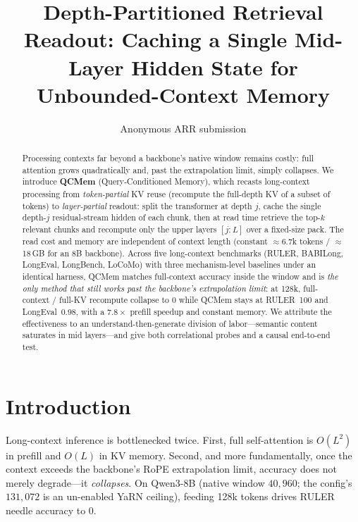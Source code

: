 \documentclass[11pt]{article}
\title{Depth-Partitioned Retrieval Readout: Caching a Single Mid-Layer
Hidden State for Unbounded-Context Memory}
\author{Anonymous ARR submission}
\begin{document}
\maketitle

\begin{abstract}
Processing contexts far beyond a backbone's native window remains costly:
full attention grows quadratically and, past the extrapolation limit,
simply collapses. We introduce \textbf{QCMem} (Query-Conditioned Memory),
which recasts long-context processing from \emph{token-partial} KV reuse
(recompute the full-depth KV of a subset of tokens) to
\emph{layer-partial} readout: split the transformer at depth $j$, cache the
single depth-$j$ residual-stream hidden of each chunk, then at read time
retrieve the top-$k$ relevant chunks and recompute only the upper layers
$[j{:}L]$ over a fixed-size pack. The read cost and memory are independent of
context length (constant $\approx$6.7k tokens / $\approx$18\,GB for an 8B
backbone). Across five long-context benchmarks (RULER, BABILong, LongEval,
LongBench, LoCoMo) with three mechanism-level baselines under an identical
harness, QCMem matches full-context accuracy inside the window and is
\emph{the only method that still works past the backbone's extrapolation
limit}: at 128k, full-context / full-KV recompute collapse to 0 while QCMem
stays at RULER~100 and LongEval~0.98, with a $7.8\times$ prefill speedup and
constant memory. We attribute the effectiveness to an
understand-then-generate division of labor---semantic content saturates in
mid layers---and give both correlational probes and a causal end-to-end test.
\end{abstract}

\section{Introduction}
Long-context inference is bottlenecked twice. First, full self-attention is
$O(L^2)$ in prefill and $O(L)$ in KV memory. Second, and more fundamentally,
once the context exceeds the backbone's RoPE extrapolation limit, accuracy
does not merely degrade---it \emph{collapses}. On Qwen3-8B (native window
$40{,}960$; the config's $131{,}072$ is an un-enabled YaRN ceiling), feeding
128k tokens drives RULER needle accuracy to $0$.
\end{document}
